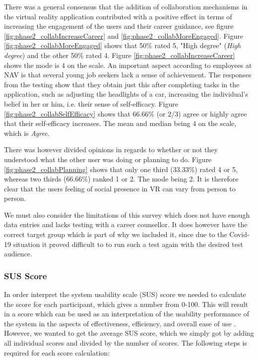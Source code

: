 There was a general consensus that the addition of collaboration mechanisms in the virtual reality application contributed with a positive effect in terms of increasing the engagement of the users and their career guidance, see figure \ref{fig:phase2_collabIncreaseCareer} and \ref{fig:phase2_collabMoreEngaged}. Figure \ref{fig:phase2_collabMoreEngaged} shows that 50\% rated 5, "High degree" (\textit{High degree}) and the other 50\% rated 4. Figure \ref{fig:phase2_collabIncreaseCareer}  shows the mode is 4 on the scale. 
An important aspect according to employees at NAV is that several young job seekers lack a sense of achievement. The responses from the testing show that they obtain just this after completing tasks in the application, such as adjusting the headlights of a car, increasing the individual's belief in her or him, i.e. their sense of self-efficacy. Figure \ref{fig:phase2_collabSelfEfficacy} shows that 66.66\% (or 2/3) agree or highly agree that their self-efficacy increases. The mean and median being 4 on the scale, which is \textit{Agree}. 

There was however divided opinions in regards to whether or not they understood what the other user was doing or planning to do. Figure \ref{fig:phase2_collabPlanning} shows that only one third (33.33\%) rated 4 or 5, whereas two thirds (66.66\%) ranked 1 or 2. The mode being 2. It is therefore clear that the users feeling of social presence in VR can vary from person to person. 

We must also consider the limitations of this survey which does not have enough data entries and lacks testing with a career counsellor. It does however have the correct target group which is part of why we included it, since due to the Covid-19 situation it proved difficult to to run such a test again with the desired test audience.


\subsubsection{SUS Score}
\label{section:phase2SUS}
In order interpret the system usability scale (SUS) score we needed to calculate the score for each participant, which gives a number from 0-100. This will result in a score which can be used as an interpretation of the usability performance of the system in the aspects of effectiveness, efficiency, and overall ease of use \cite{SusMeasuringInterpret}. However, we wanted to get the average SUS score, which we simply got by adding all individual scores and divided by the number of scores. The following steps is required for each score calculation: 


